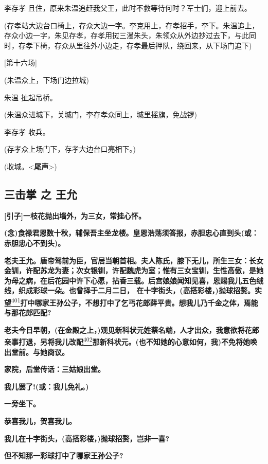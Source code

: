 李存孝 且住，原来朱温追赶我父王，此时不救等待何时？军士们，迎上前去。

(存孝站大边台口椅上，存众大边一字。李克用上，存孝招手，李下。朱温追上，存众小边一字，朱见存孝，存孝用挝三漫朱头，朱领众从外边抄过去下，与此同时，存孝下椅，存众从里往外小边走，存孝最后押队，绕回来，从下场门追下)

{[}第十六场{]}

(朱温众上，下场门边拉城)

朱温 扯起吊桥。

(朱温众进城下，关城门，李存孝众同上，城里摇旗，免战锣)

李存孝 收兵。

(存孝众上场门下，存孝大边台口亮相下。)

(收城。\textless{}\textbf{尾声}\textgreater{})

\hypertarget{ux4e09ux51fbux638c-ux4e4b-ux738bux5141}{%
\subsection{三击掌 之
王允}\label{ux4e09ux51fbux638c-ux4e4b-ux738bux5141}}

\textbf{{[}引子{]}一枝花抛出墙外，为三女，常挂心怀。}

\textbf{(念)食禄君恩数十秋，辅保吾主坐龙楼。皇恩浩荡须答报，赤胆忠心直到头(或：赤胆忠心不到头)。}

\textbf{老夫王允。唐帝驾前为臣，官居当朝首相。夫人陈氏，膝下无儿，所生三女：长女金钏，许配苏龙为妻；次女银钏，许配魏虎为室；惟有三女宝钏，生性高傲，是她为母之病，在后花园中许下心愿，拈香三载。后宫娘娘闻知见喜，恩赐我儿五色绒线，织成彩球一朵。也曾择于二月二日，
在十字街头，(高搭彩楼，)抛球招赘。实望}\protect\hyperlink{fn401}{\textsuperscript{401}}\textbf{打中哪家王孙公子，不想打中了乞丐花郎薛平贵。想我儿乃千金之体，焉能与那花郎匹配?}

\textbf{老夫今日早朝，(在金殿之上，)观见新科状元姓蔡名端，人才出众，我意欲将花郎亲事打退，另将我儿改配}\protect\hyperlink{fn402}{\textsuperscript{402}}\textbf{那新科状元。(也不知她的心意如何，我)不免将她唤出堂前。与她商议。}

\textbf{家院，后堂传话：三姑娘出堂。}

\textbf{我儿罢了!(或：我儿免礼。)}

\textbf{一旁坐下。}

\textbf{恭喜我儿，贺喜我儿。}

\textbf{我儿在十字街头，(高搭彩楼，)抛球招赘，岂非一喜?}

\textbf{但不知那一彩球打中了哪家王孙公子?}

